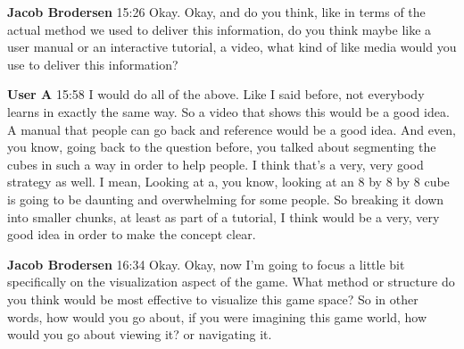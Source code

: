 \documentclass{article}
\begin{document}
\noindent \textbf{Jacob Brodersen}   15:26
Okay.
Okay, and do you think, like in terms of the actual method we used to deliver this information, do you think maybe like a user manual or an interactive tutorial, a video, what kind of like media would you use to deliver this information?

\noindent \textbf{User A}   15:58
I would do all of the above. Like I said before, not everybody learns in exactly the same way. So a video that shows this would be a good idea. A manual that people can go back and reference would be a good idea. And even, you know, going back to the question before, you talked about segmenting the cubes in such a way in order to help people. I think that's a very, very good strategy as well. I mean,
Looking at a, you know, looking at an 8 by 8 by 8 cube is going to be daunting and overwhelming for some people. So breaking it down into smaller chunks, at least as part of a tutorial, I think would be a very, very good idea in order to make the concept clear.

\noindent \textbf{Jacob Brodersen}   16:34
Okay.
Okay, now I'm going to focus a little bit specifically on the visualization aspect of the game. What method or structure do you think would be most effective to visualize this game space? So in other words, how would you go about, if you were imagining this game world, how would you go about viewing it?
or navigating it.
\end{document}
